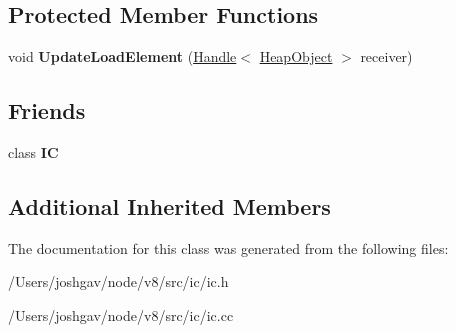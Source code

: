 \subsection*{Protected Member Functions}
\begin{DoxyCompactItemize}
\item 
void {\bfseries Update\+Load\+Element} (\hyperlink{classv8_1_1internal_1_1_handle}{Handle}$<$ \hyperlink{classv8_1_1internal_1_1_heap_object}{Heap\+Object} $>$ receiver)\hypertarget{classv8_1_1internal_1_1_keyed_load_i_c_ace410dd7f5a1ad28b73c4ecb1509e0d4}{}\label{classv8_1_1internal_1_1_keyed_load_i_c_ace410dd7f5a1ad28b73c4ecb1509e0d4}

\end{DoxyCompactItemize}
\subsection*{Friends}
\begin{DoxyCompactItemize}
\item 
class {\bfseries IC}\hypertarget{classv8_1_1internal_1_1_keyed_load_i_c_ae59e849648858af1fd22081890d47b78}{}\label{classv8_1_1internal_1_1_keyed_load_i_c_ae59e849648858af1fd22081890d47b78}

\end{DoxyCompactItemize}
\subsection*{Additional Inherited Members}


The documentation for this class was generated from the following files\+:\begin{DoxyCompactItemize}
\item 
/\+Users/joshgav/node/v8/src/ic/ic.\+h\item 
/\+Users/joshgav/node/v8/src/ic/ic.\+cc\end{DoxyCompactItemize}
